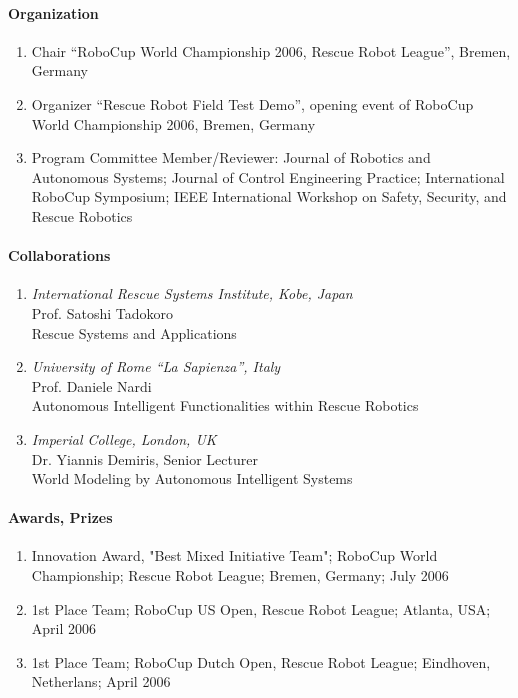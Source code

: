 \paragraph{Organization}

\begin{enumerate}
\item Chair ``RoboCup World Championship 2006, Rescue Robot League'', Bremen, Germany
\item Organizer ``Rescue Robot Field Test Demo'', opening event of RoboCup World
  Championship 2006, Bremen, Germany
\item Program Committee Member/Reviewer: Journal of Robotics and Autonomous Systems;
  Journal of Control Engineering Practice; International RoboCup Symposium; IEEE
  International Workshop on Safety, Security, and Rescue Robotics
\end{enumerate}

\paragraph{Collaborations}
\begin{enumerate}
\item {\sl International Rescue Systems Institute, Kobe, Japan}\\
  Prof. Satoshi Tadokoro\\
  Rescue Systems and Applications
\item {\sl University of Rome ``La Sapienza'', Italy}\\
  Prof. Daniele Nardi\\
  Autonomous Intelligent Functionalities within Rescue Robotics
\item {\sl Imperial College, London, UK}\\
  Dr. Yiannis Demiris, Senior Lecturer\\
  World Modeling by Autonomous Intelligent Systems
\end{enumerate}

\paragraph{Awards, Prizes}
\begin{enumerate}
\item Innovation Award, "Best Mixed Initiative Team"; RoboCup World Championship; Rescue
  Robot League; Bremen, Germany; July 2006
\item 1st Place Team; RoboCup US Open, Rescue Robot League; Atlanta, USA; April 2006
\item 1st Place Team; RoboCup Dutch Open, Rescue Robot League; Eindhoven, Netherlans; April 2006
\end{enumerate}

